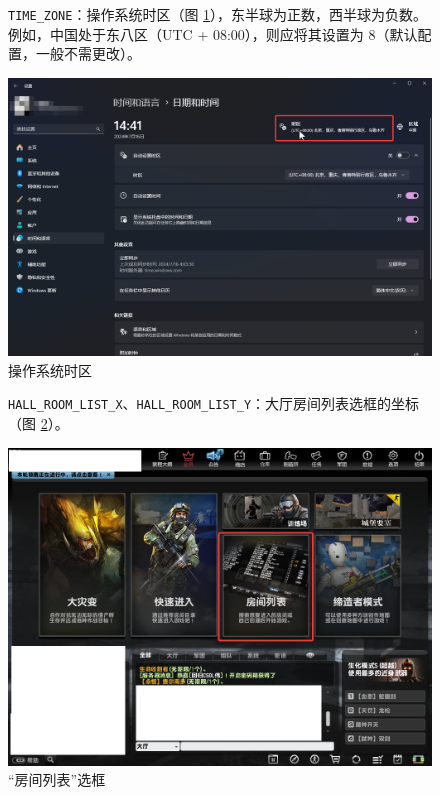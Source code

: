 \begin{figure}[H]
    \Centering
    \parbox[l]{\textwidth}{\lstinline{TIME_ZONE}：操作系统时区（图 \ref{ch2fig-os-timezone}），东半球为正数，西半球为负数。例如，中国处于东八区（UTC + 08:00），则应将其设置为 8（默认配置，一般不需更改）。}
    \includegraphics[width=\textwidth]{docs/assets/timezone}
    \caption{操作系统时区}
    \label{ch2fig-os-timezone}
\end{figure}
\clearpage

\begin{figure}[H]
    \Centering
    \parbox[l]{\textwidth}{\lstinline{HALL_ROOM_LIST_X}、\lstinline{HALL_ROOM_LIST_Y}：大厅房间列表选框的坐标（图 \ref{ch2fig-room-list}）。}
    \includegraphics[width=\textwidth]{docs/assets/room_list}
    \caption{“房间列表”选框}
    \label{ch2fig-room-list}
\end{figure}
\clearpage

